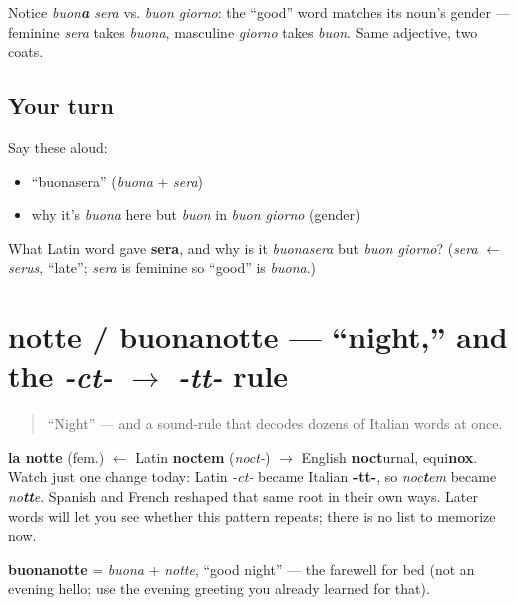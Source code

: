 \begin{grammarlens}[title={Grammar Lens: feminine agreement}]
Notice \emph{buon\textbf{a} sera} vs. \emph{buon giorno}: the \textquotedblleft{}good\textquotedblright{} word matches its noun's gender — feminine \emph{sera} takes \emph{buona}, masculine \emph{giorno} takes \emph{buon}. Same adjective, two coats.
\end{grammarlens}

\subsection*{Your turn}
Say these aloud:

\begin{itemize}
\raggedright
  \item \textquotedblleft{}buonasera\textquotedblright{} (\emph{buona} + \emph{sera})
  \item why it's \emph{buona} here but \emph{buon} in \emph{buon giorno} (gender)
\end{itemize}

\begin{tcolorbox}[breakable,colback=teal!4,colframe=teal!35!black,title={Before you move on}]
What Latin word gave \textbf{sera}, and why is it \emph{buonasera} but \emph{buon giorno}? (\emph{sera} $\leftarrow$ \emph{serus}, \textquotedblleft{}late\textquotedblright{}; \emph{sera} is feminine so \textquotedblleft{}good\textquotedblright{} is \emph{buona}.)
\end{tcolorbox}
\section[notte / buonanotte]{notte / buonanotte — \textquotedblleft{}night,\textquotedblright{} and the \emph{-ct-} $\to$ \emph{-tt-} rule}

\label{lesson:IT-C01-notte}



\begin{quote}
\textquotedblleft{}Night\textquotedblright{} — and a sound-rule that decodes dozens of Italian words at once.
\end{quote}

\begin{cousinweb}
\textbf{la notte} (fem.) $\leftarrow$ Latin \textbf{noctem} (\emph{noct-}) $\to$ English \textbf{noct}urnal, equi\textbf{nox}. Watch just one change today: Latin \emph{-ct-} became Italian \textbf{-tt-}, so \emph{noc\textbf{t}em} became \emph{no\textbf{tt}e}. Spanish and French reshaped that same root in their own ways. Later words will let you see whether this pattern repeats; there is no list to memorize now.

\textbf{buonanotte} = \emph{buona} + \emph{notte}, \textquotedblleft{}good night\textquotedblright{} — the farewell for bed (not an evening hello; use the evening greeting you already learned for that).
\end{cousinweb}

